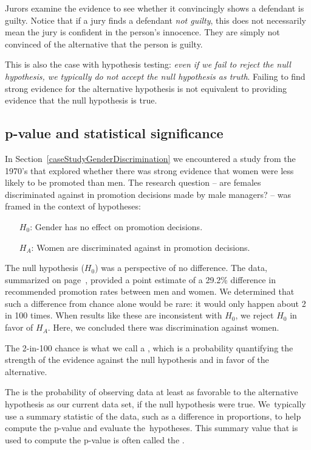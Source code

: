 Jurors examine the evidence to see whether it convincingly shows a defendant is guilty. Notice that if a jury finds a defendant \emph{not guilty}, this does not necessarily mean the jury is confident in the person's innocence. They are simply not convinced of the alternative that the person is guilty.

This is also the case with hypothesis testing: \emph{even if we fail to reject the null hypothesis, we typically do not accept the null hypothesis as truth}. Failing to find strong evidence for the alternative hypothesis is not equivalent to providing evidence that the null hypothesis is true.


\subsection{p-value and statistical significance}

In Section~\ref{caseStudyGenderDiscrimination} we encountered a study from the 1970's that explored whether there was strong evidence that women were less likely to be promoted than men. The research question -- are females discriminated against in promotion decisions made by male managers? -- was framed in the context of hypotheses:
\begin{itemize}
\setlength{\itemsep}{0mm}
\item[$H_0$:] Gender has no effect on promotion decisions.
\item[$H_A$:] Women are discriminated against in promotion decisions.
\end{itemize}
The null hypothesis ($H_0$) was a perspective of no difference. The data, summarized on page~\pageref{discriminationResults}, provided a point estimate of a 29.2\% difference in recommended promotion rates between men and women. We determined that such a difference from chance alone would be rare: it would only happen about 2 in 100 times. When results like these are inconsistent with $H_0$, we reject $H_0$ in favor of $H_A$. Here, we concluded there was discrimination against women.

The 2-in-100 chance is what we call a , which is a probability quantifying the strength of the evidence against the null hypothesis and in favor of the alternative. %

\begin{termBox}{
The  is the probability of observing data at least as favorable to the alternative hypothesis as our current data set, if the null hypothesis were true. We~typically use a summary statistic of the data, such as a difference in proportions, to help compute the p-value and evaluate the~hypotheses. This summary value that is used to compute the p-value is often called the .}
\end{termBox}

